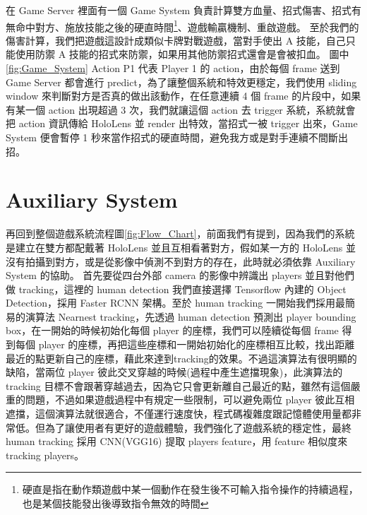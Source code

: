 
在 Game Server 裡面有一個 Game System 負責計算雙方血量、招式傷害、招式有無命中對方、施放技能之後的硬直時間\footnote{硬直是指在動作類遊戲中某一個動作在發生後不可輸入指令操作的持續過程，也是某個技能發出後導致指令無效的時間}、遊戲輸贏機制、重啟遊戲。
至於我們的傷害計算，我們把遊戲這設計成類似卡牌對戰遊戲，當對手使出 A 技能，自己只能使用防禦 A 技能的招式來防禦，如果用其他防禦招式還會是會被扣血。
圖中\ref{fig:Game_System} Action P1 代表 Player 1 的 action，由於每個 frame 送到 Game Server 都會進行 predict，為了讓整個系統和特效更穩定，我們使用 sliding window 來判斷對方是否真的做出該動作，在任意連續 4 個 frame 的片段中，如果有某一個 action 出現超過 3 次，我們就讓這個 action 去 trigger 系統，系統就會把 action 資訊傳給 HoloLens 並 render 出特效，當招式一被 trigger 出來，Game System 便會暫停 1 秒來當作招式的硬直時間，避免我方或是對手連續不間斷出招。

\newpage

\section{Auxiliary System}


再回到整個遊戲系統流程圖\ref{fig:Flow_Chart}，前面我們有提到，因為我們的系統是建立在雙方都配戴著 HoloLens 並且互相看著對方，假如某一方的 HoloLens 並沒有拍攝到對方，或是從影像中偵測不到對方的存在，此時就必須依靠 Auxiliary System 的協助。
首先要從四台外部 camera 的影像中辨識出 players 並且對他們做 tracking，這裡的 human detection 我們直接選擇 Tensorflow 內建的 Object Detection，採用 Faster RCNN 架構。至於 human tracking 一開始我們採用最簡易的演算法 Nearnest tracking，先透過 human detection 預測出 player bounding box，在一開始的時候初始化每個 player 的座標，我們可以陸續從每個 frame 得到每個 player 的座標，再把這些座標和一開始初始化的座標相互比較，找出距離最近的點更新自己的座標，藉此來達到tracking的效果。不過這演算法有很明顯的缺陷，當兩位 player 彼此交叉穿越的時候(過程中產生遮擋現象)，此演算法的 tracking 目標不會跟著穿越過去，因為它只會更新離自己最近的點，雖然有這個嚴重的問題，不過如果遊戲過程中有規定一些限制，可以避免兩位 player 彼此互相遮擋，這個演算法就很適合，不僅運行速度快，程式碼複雜度跟記憶體使用量都非常低。但為了讓使用者有更好的遊戲體驗，我們強化了遊戲系統的穩定性，最終 human tracking 採用 CNN(VGG16) 提取 players feature，用 feature 相似度來 tracking players。

